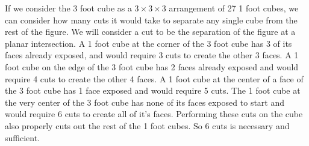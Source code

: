 \documentclass[12pt]{article}
\begin{document}
If we consider the 3 foot cube as a $3\times 3\times 3$ arrangement of 27 1 foot cubes, we can consider how many cuts it would take to separate any single cube from the rest of the figure. We will consider a cut to be the separation of the figure at a planar intersection. A 1 foot cube at the corner of the 3 foot cube has 3 of its faces already exposed, and would require 3 cuts to create the other 3 faces. A 1 foot cube on the edge of the 3 foot cube has 2 faces already exposed and would require 4 cuts to create the other 4 faces. A 1 foot cube at the center of a face of the 3 foot cube has 1 face exposed and would require 5 cuts. The 1 foot cube at the very center of the 3 foot cube has none of its faces exposed to start and would require 6 cuts to create all of it's faces. Performing these cuts on the cube also properly cuts out the rest of the 1 foot cubes. So 6 cuts is necessary and sufficient.
\end{document}
